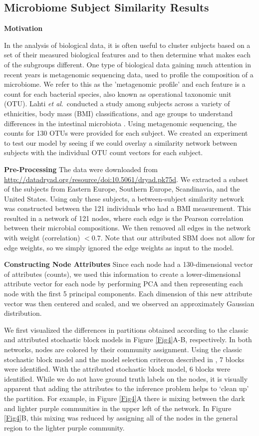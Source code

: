 \subsection{Microbiome Subject Similarity Results}

{\bf Motivation}

In the analysis of biological data, it is often useful to cluster subjects based on a set of their measured biological features and to then determine what makes each of the subgroups different. One type of biological data gaining much attention in recent years is metagenomic sequencing data, used to profile the composition of a microbiome. We refer to this as the 'metagenomic profile' and each feature is a count for each bacterial species, also known as operational taxonomic unit (OTU). Lahti \emph{et al}.\ conducted a study among subjects across a variety of ethnicities, body mass (BMI) classifications, and age groups to understand differences in the intestinal microbiota \cite{microbiomedata}. Using metagenomic sequencing, the counts for 130 OTUs were provided for each subject. We created an experiment to test our model by seeing if we could overlay a similarity network between subjects with the individual OTU count vectors for each subject. 

{\bf Pre-Processing}
The data were downloaded from \url{http://datadryad.org/resource/doi:10.5061/dryad.pk75d}. We extracted a subset of the subjects from Eastern Europe, Southern Europe, Scandinavia, and the United States. Using only these subjects, a between-subject similarity network was constructed between the 121 individuals who had a BMI measurement. This resulted in a network of 121 nodes, where each edge is the Pearson correlation between their microbial compositions. We then removed all edges in the network with weight (correlation) $<0.7$. Note that our attributed SBM does not allow for edge weights, so we simply ignored the edge weights as input to the model.

{\bf Constructing Node Attributes}
Since each node had a 130-dimensional vector of attributes (counts), we used this information to create a lower-dimensional attribute vector for each node by performing PCA and then representing each node with the first 5 principal components. Each dimension of this new attribute vector was then centered and scaled, and we observed an approximately Gaussian distribution. 

We first visualized the differences in partitions obtained according to the classic and attributed stochastic block models in Figure \ref{Fig4}A-B, respectively. In both networks, nodes are colored by their community assignment. Using the classic stochastic block model and the model selection criteron described in \cite{dudin}, 7 blocks were identified. With the attributed stochastic block model, 6 blocks were identified. While we do not have ground truth labels on the nodes, it is visually apparent that adding the attributes to the inference problem helps to `clean up' the partition. For example, in Figure \ref{Fig4}A there is mixing between the dark and lighter purple communities in the upper left of the network. In Figure \ref{Fig4}B, this mixing was reduced by assigning all of the nodes in the general region to the lighter purple community. 

